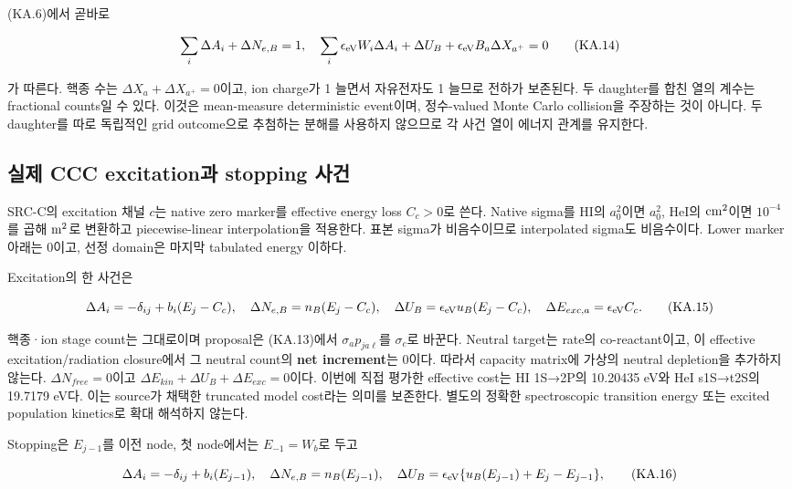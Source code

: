 \documentclass[11pt,a4paper]{article}
\begin{document}
(KA.6)에서 곧바로

\[
 \sum_i\Delta A_i+\Delta N_{e,B}=1,
\quad
 \sum_i\epsilon_{\rm eV}W_i\Delta A_i+\Delta U_B+\epsilon_{\rm eV}B_a\Delta X_{a^+}=0
 \tag{KA.14}
\]

가 따른다. 핵종 수는 \(\Delta X_a+\Delta X_{a^+}=0\)이고, ion charge가 1 늘면서 자유전자도 1 늘므로 전하가 보존된다. 두 daughter를 합친 열의 계수는 fractional counts일 수 있다. 이것은 mean-measure deterministic event이며, 정수-valued Monte Carlo collision을 주장하는 것이 아니다. 두 daughter를 따로 독립적인 grid outcome으로 추첨하는 분해를 사용하지 않으므로 각 사건 열이 에너지 관계를 유지한다.

\hypertarget{uxc2e4uxc81c-ccc-excitationuxacfc-stopping-uxc0acuxac74}{%
\subsection{실제 CCC excitation과 stopping 사건}\label{uxc2e4uxc81c-ccc-excitationuxacfc-stopping-uxc0acuxac74}}

SRC-C의 excitation 채널 \(c\)는 native zero marker를 effective energy loss \(C_c>0\)로 쓴다. Native sigma를 HI의 \(a_0^2\)이면 \(a_0^2\), HeI의 \({\rm cm}^2\)이면 \(10^{-4}\)를 곱해 \({\rm m}^2\)로 변환하고 piecewise-linear interpolation을 적용한다. 표본 sigma가 비음수이므로 interpolated sigma도 비음수이다. Lower marker 아래는 0이고, 선정 domain은 마지막 tabulated energy 이하다.

Excitation의 한 사건은

\[
 \Delta A_i=-\delta_{ij}+b_i(E_j-C_c),\quad
 \Delta N_{e,B}=n_B(E_j-C_c),\quad
 \Delta U_B=\epsilon_{\rm eV}u_B(E_j-C_c),\quad
 \Delta E_{exc,a}=\epsilon_{\rm eV}C_c.
 \tag{KA.15}
\]

핵종·ion stage count는 그대로이며 proposal은 (KA.13)에서 \(\sigma_ap_{ja\ell}\)를 \(\sigma_c\)로 바꾼다. Neutral target는 rate의 co-reactant이고, 이 effective excitation/radiation closure에서 그 neutral count의 \textbf{net increment}는 0이다. 따라서 capacity matrix에 가상의 neutral depletion을 추가하지 않는다. \(\Delta N_{free}=0\)이고 \(\Delta E_{kin}+\Delta U_B+\Delta E_{exc}=0\)이다. 이번에 직접 평가한 effective cost는 HI 1S→2P의 10.20435 eV와 HeI s1S→t2S의 19.7179 eV다. 이는 source가 채택한 truncated model cost라는 의미를 보존한다. 별도의 정확한 spectroscopic transition energy 또는 excited population kinetics로 확대 해석하지 않는다.

Stopping은 \(E_{j-1}\)를 이전 node, 첫 node에서는 \(E_{-1}=W_b\)로 두고

\[
 \Delta A_i=-\delta_{ij}+b_i(E_{j-1}),\quad
 \Delta N_{e,B}=n_B(E_{j-1}),\quad
 \Delta U_B=\epsilon_{\rm eV}\{u_B(E_{j-1})+E_j-E_{j-1}\},
 \tag{KA.16}
\]
\end{document}
